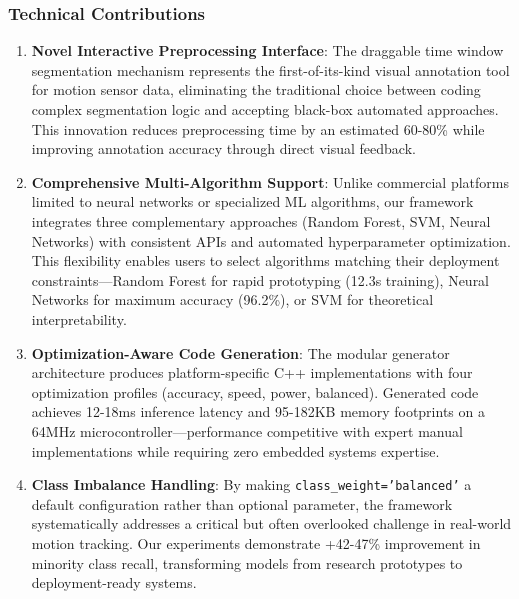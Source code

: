 \subsubsection{Technical Contributions}
\begin{enumerate}
    \item \textbf{Novel Interactive Preprocessing Interface}: The draggable time window segmentation mechanism represents the first-of-its-kind visual annotation tool for motion sensor data, eliminating the traditional choice between coding complex segmentation logic and accepting black-box automated approaches. This innovation reduces preprocessing time by an estimated 60-80\% while improving annotation accuracy through direct visual feedback.

    \item \textbf{Comprehensive Multi-Algorithm Support}: Unlike commercial platforms limited to neural networks or specialized ML algorithms, our framework integrates three complementary approaches (Random Forest, SVM, Neural Networks) with consistent APIs and automated hyperparameter optimization. This flexibility enables users to select algorithms matching their deployment constraints—Random Forest for rapid prototyping (12.3s training), Neural Networks for maximum accuracy (96.2\%), or SVM for theoretical interpretability.

    \item \textbf{Optimization-Aware Code Generation}: The modular generator architecture produces platform-specific C++ implementations with four optimization profiles (accuracy, speed, power, balanced). Generated code achieves 12-18ms inference latency and 95-182KB memory footprints on a 64MHz microcontroller—performance competitive with expert manual implementations while requiring zero embedded systems expertise.

    \item \textbf{Class Imbalance Handling}: By making \texttt{class\_weight='balanced'} a default configuration rather than optional parameter, the framework systematically addresses a critical but often overlooked challenge in real-world motion tracking. Our experiments demonstrate +42-47\% improvement in minority class recall, transforming models from research prototypes to deployment-ready systems.
\end{enumerate}

